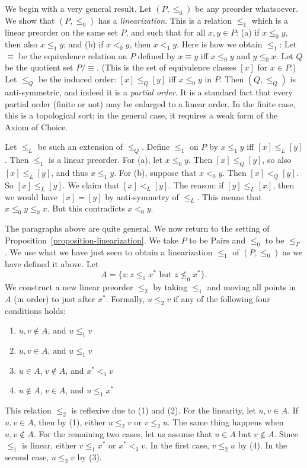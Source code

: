 \documentclass[letterpaper]{article} %
\theoremstyle{definition}
\newcommand{\set}[1]{\{ #1 \}}
\newcommand{\Pairs}{\mbox{Pairs}}
\newcommand{\provle}{\le_{\Gamma}}
\begin{document}
We begin with a very general result.   Let $(P,\leq_0)$ be any preorder whatsoever.
We show that $(P,\leq_0)$ has a 
 \emph{linearization}.  This is a relation $\leq_1$ which is a linear preorder on the same set $P$,
and such that for all $x,y\in P$:
(a) if $x \leq_0 y$, then also $x\leq_1 y$; and 
(b) if $x <_0 y$, then $x <_1 y$.
Here is how we obtain $\leq_1$:
Let $\equiv$ be the equivalence
relation on $P$ defined by $x \equiv y$ iff $x \leq_0 y$ and
$y\leq_0 x$. Let $Q$ be the quotient set $P/\!\equiv$.
(This is the set of equivalence classes $[x]$ for $x\in P$.)
Let $\leq_Q$ be the induced order: $[x]\leq_Q [y]$ iff $x \leq_0 y$ in $P$.  Then $(Q, \leq_Q)$ is anti-symmetric, and indeed it is a 
\emph{partial order}.  It is a standard fact that every partial order
(finite or not) may be enlarged to a linear order.
In the finite case, this is a topological sort;
in the general case, it requires a weak form of the Axiom of Choice.

Let $\leq_L$ be such an extension of $\leq_Q$.
Define $\leq_1$ on $P$ by $x \leq_1 y$ iff $[x] \leq_L [y]$.
Then $\leq_1$  is 
a linear preorder.  For (a), let  $x \leq_0 y$.
Then $[x] \leq_Q [y]$, so also $[x] \leq_L [y]$,
and thus $x\leq_1 y$.  For (b), suppose that $x <_0 y$.
Then $[x] <_Q [y]$.  So $[x] \leq_L [y]$.
We claim that $[x] <_L [y]$.  The reason:
if $[y] \leq_L [x]$, then we would have $[x] = [y]$
by anti-symmetry of $\leq_L$. 
This means that $x \leq_0 y\leq_0 x$.
But this contradicts $x <_0 y$.

The paragraphs above are quite general.   We now return to the
setting of Proposition~\ref{proposition-linearization}.
We take $P$ to be $\Pairs$
and $\leq_0$ to be $\provle$.
We use what we have just seen  to obtain a linearization $\leq_1$
of $(P,\leq_0)$
as we have defined it above.
Let \[ A = \set{z :  z \leq_1 x^*  \mbox{ but } z \nleq_0 x^*}.\]
We construct a new linear preorder $\leq_2$ by taking $\leq_1$ 
and moving all points in $A$ (in order) to just after $x^*$. 
Formally, $u \leq_2 v$ if any of the following four conditions holds:
\begin{enumerate}
    \item  $u,v\notin A$, and $u\leq_1 v$
    \item $u, v \in A$, and $u\leq_1 v$
        \item $u\in A$, $v\notin A$, and $x^* <_1 v$
    \item $u\notin A$, $v\in A$, and $u\leq_1 x^*$

\end{enumerate}
This relation $\leq_2$ is reflexive due to (1) and (2).
For the linearity, let $u, v\in A$.   If $u,v\in A$, then by (1), either $u \leq_2 v$ or $v\leq_2 u$.
The same thing happens when $u,v\notin A$.   For the remaining two cases, let us assume that $u\in A$ 
but $v\notin A$.     Since $\leq_1$ is linear, either $v \leq_1 x^*$ or $x^* <_1 v$.
In the first case, $v \leq_2 u$ by (4).   In the second case, $u\leq_2 v$ by (3).
\end{document}
